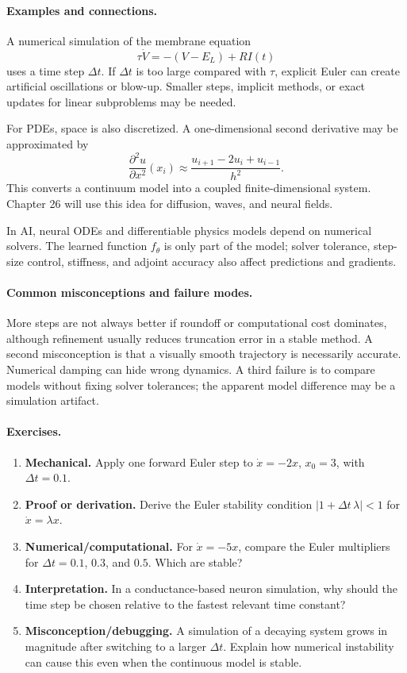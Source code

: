 \paragraph{Examples and connections.}
A numerical simulation of the membrane equation
\[
\tau \dot V=-(V-E_L)+RI(t)
\]
uses a time step \(\Delta t\). If \(\Delta t\) is too large compared with \(\tau\), explicit Euler can create artificial oscillations or blow-up. Smaller steps, implicit methods, or exact updates for linear subproblems may be needed.

For PDEs, space is also discretized. A one-dimensional second derivative may be approximated by
\[
\frac{\partial^2 u}{\partial x^2}(x_i)
\approx
\frac{u_{i+1}-2u_i+u_{i-1}}{h^2}.
\]
This converts a continuum model into a coupled finite-dimensional system. Chapter 26 will use this idea for diffusion, waves, and neural fields.

In AI, neural ODEs and differentiable physics models depend on numerical solvers. The learned function \(f_\theta\) is only part of the model; solver tolerance, step-size control, stiffness, and adjoint accuracy also affect predictions and gradients.

\paragraph{Common misconceptions and failure modes.}
More steps are not always better if roundoff or computational cost dominates, although refinement usually reduces truncation error in a stable method. A second misconception is that a visually smooth trajectory is necessarily accurate. Numerical damping can hide wrong dynamics. A third failure is to compare models without fixing solver tolerances; the apparent model difference may be a simulation artifact.

\paragraph{Exercises.}
\begin{enumerate}[label=\textbf{24.4.\arabic*.}, leftmargin=*]
\item \textbf{Mechanical.} Apply one forward Euler step to \(\dot x=-2x\), \(x_0=3\), with \(\Delta t=0.1\).
\item \textbf{Proof or derivation.} Derive the Euler stability condition \(|1+\Delta t\,\lambda|<1\) for \(\dot x=\lambda x\).
\item \textbf{Numerical/computational.} For \(\dot x=-5x\), compare the Euler multipliers for \(\Delta t=0.1\), \(0.3\), and \(0.5\). Which are stable?
\item \textbf{Interpretation.} In a conductance-based neuron simulation, why should the time step be chosen relative to the fastest relevant time constant?
\item \textbf{Misconception/debugging.} A simulation of a decaying system grows in magnitude after switching to a larger \(\Delta t\). Explain how numerical instability can cause this even when the continuous model is stable.
\end{enumerate}

